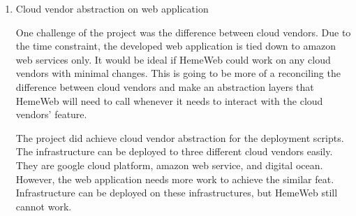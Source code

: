 \begin{enumerate}
	\item Cloud vendor abstraction on web application
	
	One challenge of the project was the difference between cloud vendors. Due to the time constraint, the developed web application is tied down to amazon web services only. It would be ideal if HemeWeb could work on any cloud vendors with minimal changes. This is going to be more of a reconciling the difference between cloud vendors and make an abstraction layers that HemeWeb will need to call whenever it needs to interact with the cloud vendors' feature.
    
    The project did achieve cloud vendor abstraction for the deployment scripts. The infrastructure can be deployed to three different cloud vendors easily. They are google cloud platform, amazon web service, and digital ocean. However, the web application needs more work to achieve the similar feat. Infrastructure can be deployed on these infrastructures, but HemeWeb still cannot work.
	
\end{enumerate}

